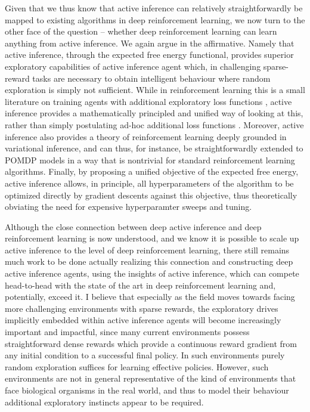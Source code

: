 Given that we thus know that active inference can relatively straightforwardly be mapped to existing algorithms in deep reinforcement learning, we now turn to the other face of the question -- whether deep reinforcement learning can learn anything from active inference. We again argue in the affirmative. Namely that active inference, through the expected free energy functional, provides superior exploratory capabilities of active inference agent which, in challenging sparse-reward tasks are necessary to obtain intelligent behaviour where random exploration is simply not sufficient. While in reinforcement learning this is a small literature on training agents with additional exploratory loss functions \citep{pathak2017curiosity,shyam_model-based_2019,still2012information,chua_deep_2018,nagabandi2019deep,klyubin2005empowerment}, active inference provides a mathematically principled and unified way of looking at this, rather than simply postulating ad-hoc additional loss functions \citep{oudeyer2009intrinsic}. Moreover, active inference also provides a theory of reinforcement learning deeply grounded in variational inference, and can thus, for instance, be straightforwardly extended to POMDP models in a way that is nontrivial for standard reinforcement learning algorithms. Finally, by proposing a unified objective of the expected free energy, active inference allows, in principle, all hyperparameters of the algorithm to be optimized directly by gradient descents against this objective, thus theoretically obviating the need for expensive hyperparamter sweeps and tuning. 

Although the close connection between deep active inference and deep reinforcement learning is now understood, and we know it is possible to scale up active inference to the level of deep reinforcement learning, there still remains much work to be done actually realizing this connection and constructing deep active inference agents, using the insights of active inference, which can compete head-to-head with the state of the art in deep reinforcement learning and, potentially, exceed it. I believe that especially as the field moves towards facing more challenging environments with sparse rewards, the exploratory drives implicitly embedded within active inference agents will become increasingly important and impactful, since many current environments possess straightforward dense rewards which provide a continuous reward gradient from any initial condition to a successful final policy. In such environments purely random exploration suffices for learning effective policies. However, such environments are not in general representative of the kind of environments that face biological organisms in the real world, and thus to model their behaviour additional exploratory instincts appear to be required. 

